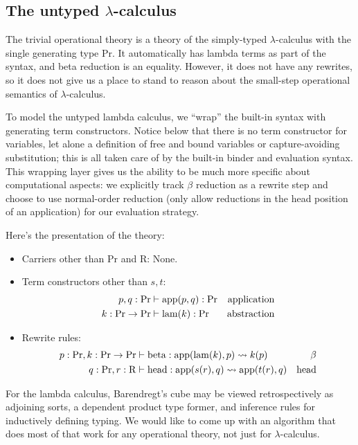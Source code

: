 \documentclass[11pt]{article}
\newcommand{\Proc}{\mathrm{Pr}}
\newcommand{\Rew}{\mathrm{R}}
\newcommand{\rw}{\rightsquigarrow}
\begin{document}
\subsection{The untyped \texorpdfstring{$\lambda$}{λ}-calculus}
The trivial operational theory is a theory of the simply-typed $\lambda$-calculus with the single generating type $\Proc.$  It automatically has lambda terms as part of the syntax, and beta reduction is an equality.  However, it does not have any rewrites, so it does not give us a place to stand to reason about the small-step operational semantics of $\lambda$-calculus.

To model the untyped lambda calculus, we ``wrap'' the built-in syntax with generating term constructors.  Notice below that there is no term constructor for variables, let alone a definition of free and bound variables or capture-avoiding substitution; this is all taken care of by the built-in binder and evaluation syntax.  This wrapping layer gives us the ability to be much more specific about computational aspects: we explicitly track $\beta$ reduction as a rewrite step and choose to use normal-order reduction (only allow reductions in the head position of an application) for our evaluation strategy.

Here's the presentation of the theory:

\begin{itemize}
    \item Carriers other than \(\Proc\) and \(\Rew\): None.

    \item Term constructors other than $s,t:$
    \begin{align*}
        p, q:\Proc &\vdash {\rm app}(p, q): \Proc & \mbox{application}\\
        k:\Proc \to \Proc & \vdash {\rm lam}(k): \Proc & \mbox{abstraction}\\ 
    \end{align*}
    \item Rewrite rules:
    \begin{align*}
        p:\Proc, k:\Proc \to \Proc &\vdash {\rm beta}:{\rm app}({\rm lam}(k), p) \rw k(p) & \beta \\
        q: \Proc, r: \Rew & \vdash {\rm head}: {\rm app}(s(r), q) \rw {\rm app}(t(r), q) & \mbox{head}
    \end{align*}
\end{itemize}

For the lambda calculus, Barendregt's cube may be viewed retrospectively as adjoining sorts, a dependent product type former, and inference rules for inductively defining typing.  We would like to come up with an algorithm that does most of that work for any operational theory, not just for $\lambda$-calculus.
\end{document}
